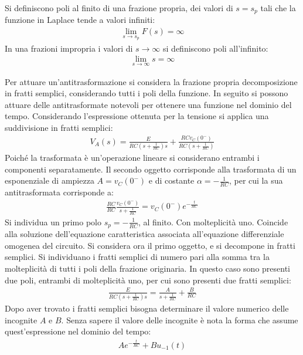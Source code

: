 \documentclass{article}
\numberwithin{equation}{subsection}
\begin{document}
Si definiscono poli al finito di una frazione propria, dei valori di $s=s_p$ tali che la funzione in Laplace tende a valori infiniti:
\begin{gather*}
    \lim_{s\to s_p}F(s)=\infty
\end{gather*} 
In una frazioni impropria i valori di $s\to\infty$ si definiscono poli all'infinito: 
\begin{gather*}
    \lim_{s\to\infty}s=\infty
\end{gather*}

Per attuare un'antitrasformazione si considera la frazione propria decomposizione in fratti semplici, considerando tutti i poli della funzione. In seguito si possono attuare delle 
antitrasformate notevoli per ottenere una funzione nel dominio del tempo. 
Considerando l'espressione ottenuta per la tensione si applica una suddivisione in fratti semplici:
\begin{gather*}
    V_A(s)=\displaystyle\frac{E}{RC\left(s+\frac{1}{RC}\right)s}+\frac{RCv_C(0^-)}{RC\left(s+\frac{1}{RC}\right)}
\end{gather*}
Poiché la trasformata è un'operazione lineare si considerano entrambi i componenti separatamente. Il secondo oggetto corrisponde alla trasformata di un esponenziale di 
ampiezza $A=v_C(0^-)$ e di costante $\alpha=-\frac{1}{RC}$, per cui la sua antitrasformata corrisponde a:
\begin{gather*}
    \displaystyle\frac{RC}{RC}\frac{v_C(0^-)}{s+\frac{1}{RC}}=v_C(0^-)e^{-\frac{t}{RC}}
\end{gather*}
Si individua un primo polo $s_p=-\frac{1}{RC}$, al finito. Con molteplicità uno. Coincide alla soluzione dell'equazione caratteristica associata all'equazione differenziale 
omogenea del circuito. Si considera ora il primo oggetto, e si decompone in fratti semplici. Si individuano i fratti semplici di numero pari alla somma tra la molteplicità di 
tutti i poli della frazione originaria. In questo caso sono presenti due poli, entrambi di molteplicità uno, per cui sono presenti due fratti semplici:
\begin{gather*}
    \displaystyle\frac{E}{RC\left(s+\frac{1}{RC}\right)s}=\frac{A}{s+\frac{1}{RC}}+\frac{B}{RC}
\end{gather*}
Dopo aver trovato i fratti semplici bisogna determinare il valore numerico delle incognite $A$ e $B$. Senza sapere il valore delle incognite è nota la forma che assume 
quest'espressione nel dominio del tempo:
\begin{gather*}
    Ae^{-\frac{t}{RC}}+Bu_{-1}(t)
\end{gather*}
\end{document}
